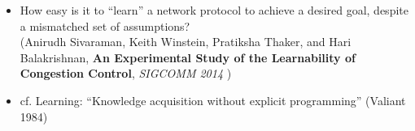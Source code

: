 \documentclass[svgnames]{beamer}
\begin{document}
\begin{Large}
\begin{frame}
\begin{itemize}
\item<2->{How easy is it to “learn” a network protocol to achieve a desired goal,
despite a mismatched set of assumptions?} \\
({\tiny Anirudh Sivaraman, Keith Winstein, Pratiksha Thaker, and Hari Balakrishnan,
\textbf{An Experimental Study of the Learnability of Congestion
  Control}, \textit{SIGCOMM 2014}
})

\item<3->{cf. Learning: ``Knowledge acquisition without explicit programming'' (Valiant 1984)}
\end{itemize}


\end{frame}



\end{Large}
\end{document}
